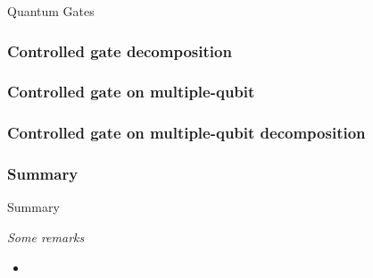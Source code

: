 \documentclass[9pt]{beamer}
\begin{document}
\begin{section}{Quantum Gates}
        \begin{frame}
            \frametitle{Controlled gate decomposition}
        
            
        
        \end{frame}
        \begin{frame}
            \frametitle{Controlled gate on multiple-qubit}
        
            
        
        \end{frame}
        \begin{frame}
            \frametitle{Controlled gate on multiple-qubit decomposition}
        
            
        
        \end{frame}

        \begin{frame}
            \frametitle{Summary}
            \begin{block}{Summary}
                
            \end{block}
            \vspace{0.2cm}
            \textit{Some remarks}
            \begin{itemize}
                \item 
            \end{itemize}
            
        
        \end{frame}

    \end{section}
\end{document}

